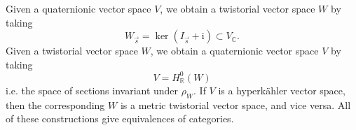 \documentclass[12pt,letterpaper,reqno]{article}
\numberwithin{equation}{section}
\newcommand{\R}{\ensuremath{\mathbb R}}
\newcommand{\C}{\ensuremath{\mathbb C}}
\newcommand{\hk}{hyperk\"ahler\xspace}
\newcommand{\I}{{\mathrm i}}
\newcommand{\fixme}[1]{{\color{orange}{[#1]}}}
\begin{document}
\begin{prop} \label{prop:twistorial-and-quaternionic-vector-spaces}
Given a quaternionic vector space $V$, we obtain a twistorial 
vector space $W$ by taking
\begin{equation}
 W_{\vec s} = \ker(I_{\vec s} + \I) \subset V_\C.
\end{equation}
Given a twistorial vector space $W$, we obtain a 
quaternionic vector space $V$ by taking
\begin{equation}
  V = H^0_\R(W)
\end{equation}
i.e. the space of sections invariant under $\rho_W$.
If $V$ is a \hk vector space, then the corresponding $W$
is a metric twistorial vector space, and vice versa.
All of these constructions give equivalences of categories.
\end{prop}

\begin{pf} \fixme{...}
\end{pf}
\end{document}
